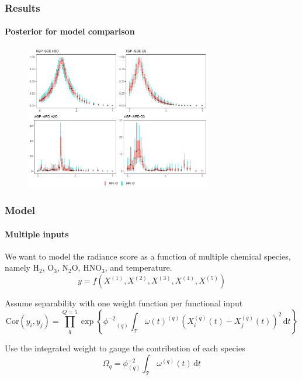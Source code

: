 \documentclass{snedecorbeamer}
\begin{document}
\begin{frame}
  \frametitle{Results}
  \framesubtitle{Posterior for model comparison}

  \begin{figure}
    \centering
    \includegraphics[height=17em]{inc/mls_weight_posterior_vifi.pdf}
  \end{figure}

\end{frame}

\begin{frame}
  \frametitle{Model}
  \framesubtitle{Multiple inputs}

  We want to model the radiance score as a function of multiple chemical
  species, namely H$_2$, O$_3$, N$_2$O, HNO$_3$, and temperature.
  \begin{equation}
    y = f(X^{(1)}, X^{(2)}, X^{(3)}, X^{(4)}, X^{(5)})
  \end{equation}

  Assume separability with one weight function per functional input
  \begin{equation}
    \mathrm{Cor}(y_i, y_j) = \prod_q^{Q = 5}
    \exp\left\{
      {\phi^{-2}}_{(q)}\int_\mathcal{T}
      \omega(t)^{(q)}{(X^{(q)}_{i}(t) - X^{(q)}_{j}(t))}^2\,\mathrm{d}t
    \right\}
  \end{equation}

  Use the integrated weight to gauge the contribution of each species
  \begin{equation}
    \Omega_q = \phi_{(q)}^{-2}\int_\mathcal{T}\omega^{(q)}(t)\,\mathrm{d}t
  \end{equation}
\end{frame}
\end{document}
